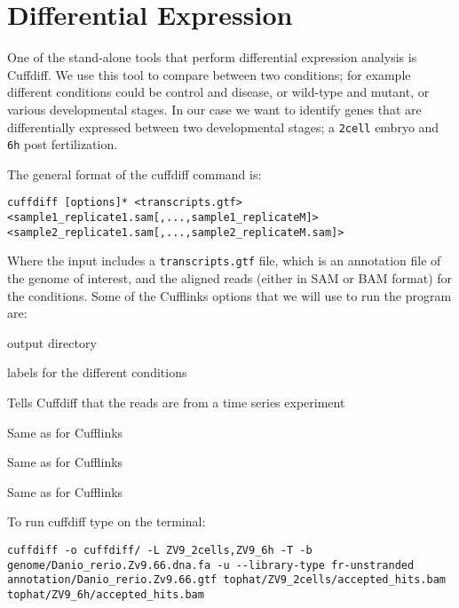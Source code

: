 \section{Differential Expression}
One of the stand-alone tools that perform differential expression analysis is
Cuffdiff. We use this tool to compare between two conditions; for example
different conditions could be control and disease, or wild-type and mutant, or
various developmental stages. In our case we want to identify genes that are
differentially expressed between two developmental stages; a \texttt{2cell}
embryo and \texttt{6h} post fertilization.

\begin{information}
The general format of the cuffdiff command is:
\begin{lstlisting}
cuffdiff [options]* <transcripts.gtf> <sample1_replicate1.sam[,...,sample1_replicateM]> <sample2_replicate1.sam[,...,sample2_replicateM.sam]>
\end{lstlisting}

Where the input includes a \texttt{transcripts.gtf} file, which is an annotation
file of the genome of interest, and the aligned reads (either in SAM or BAM
format) for the conditions.
Some of the Cufflinks options that we will use to run the program are:
\begin{description}[style=multiline,labelindent=0cm,align=right,leftmargin=\descriptionlabelspace,rightmargin=1.5cm,font=\ttfamily]
  \item[-o] output directory
  \item[-L] labels for the different conditions
  \item[-T] Tells Cuffdiff that the reads are from a time series experiment
  \item[-b] Same as for Cufflinks
  \item[-u] Same as for Cufflinks
  \item[--library-type] Same as for Cufflinks
\end{description}
\end{information}

\begin{steps}
To run cuffdiff type on the terminal:
\begin{lstlisting}
cuffdiff -o cuffdiff/ -L ZV9_2cells,ZV9_6h -T -b genome/Danio_rerio.Zv9.66.dna.fa -u --library-type fr-unstranded annotation/Danio_rerio.Zv9.66.gtf tophat/ZV9_2cells/accepted_hits.bam tophat/ZV9_6h/accepted_hits.bam
\end{lstlisting}
\end{steps}

